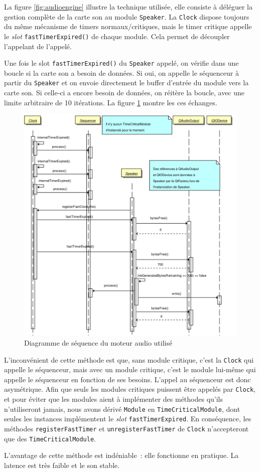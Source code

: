 La figure \ref{fig:audioengine} illustre la technique utilisée,
elle consiste à déléguer la gestion complète de la
carte son au module \verb!Speaker!. La \verb!Clock! dispose
toujours du même mécanisme de timers normaux/critiques, mais le
timer critique appelle le \emph{slot} \verb!fastTimerExpired()! de
chaque module. Cela permet de découpler l'appelant de l'appelé.

Une fois le slot \verb!fastTimerExpired()! du \verb!Speaker!
appelé, on vérifie dans une boucle si la carte son a besoin de
données. Si oui, on appelle le séquenceur à partir du
\verb!Speaker! et on envoie directement le buffer d'entrée du
module vers la carte son. Si celle-ci a encore besoin de données,
on réitère la boucle, avec une limite arbitraire de 10 itérations.
La figure \ref{fig:audioengine-sequence} montre les ces échanges.

\begin{figure}[p]
\centering
\includegraphics[width=17cm]{../img/ps/psm_currentAudioEngine_Sequence.pdf}
\caption{Diagramme de séquence du moteur audio utilisé}
\label{fig:audioengine-sequence}
\end{figure}

L'inconvénient de cette méthode est que, sans module critique,
c'est la \verb!Clock! qui appelle le séquenceur, mais avec un
module critique, c'est le module lui-même qui appelle le séquenceur
en fonction de ses besoins. L'appel au séquenceur est donc
asymétrique. Afin que seuls les modules critiques puissent être
appelés par \verb!Clock!, et pour éviter que les modules aient à
implémenter des méthodes qu'ils n'utiliseront jamais, nous avons
dérivé \verb!Module! en \verb!TimeCriticalModule!, dont seules les
instances implémentent le \emph{slot} \verb!fastTimerExpired!. En
conséquence, les méthodes \verb!registerFastTimer! et
\verb!unregisterFastTimer! de \verb!Clock! n'accepteront que des
\verb!TimeCriticalModule!.

L'avantage de cette méthode est indéniable~: elle fonctionne en
pratique. La latence est très faible et le son stable.
